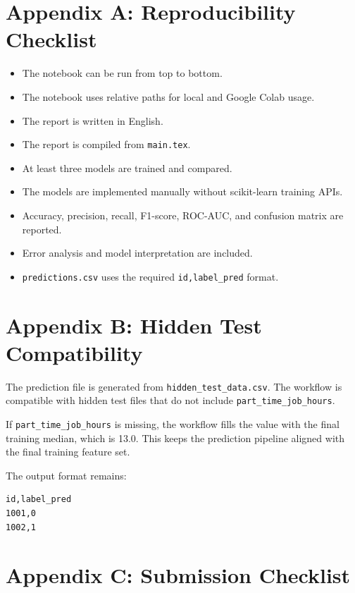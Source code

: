 ﻿\documentclass[12pt,a4paper]{article}
\begin{document}
\clearpage

\appendix

\section{Appendix A: Reproducibility Checklist}

\begin{itemize}
    \item The notebook can be run from top to bottom.
    \item The notebook uses relative paths for local and Google Colab usage.
    \item The report is written in English.
    \item The report is compiled from \texttt{main.tex}.
    \item At least three models are trained and compared.
    \item The models are implemented manually without scikit-learn training APIs.
    \item Accuracy, precision, recall, F1-score, ROC-AUC, and confusion matrix are reported.
    \item Error analysis and model interpretation are included.
    \item \texttt{predictions.csv} uses the required \texttt{id,label\_pred} format.
\end{itemize}

\clearpage

\section{Appendix B: Hidden Test Compatibility}

The prediction file is generated from \texttt{hidden\_test\_data.csv}. The workflow is compatible with hidden test files that do not include \texttt{part\_time\_job\_hours}.

If \texttt{part\_time\_job\_hours} is missing, the workflow fills the value with the final training median, which is 13.0. This keeps the prediction pipeline aligned with the final training feature set.

The output format remains:

\begin{verbatim}
id,label_pred
1001,0
1002,1
\end{verbatim}

\clearpage

\section{Appendix C: Submission Checklist}
\end{document}
